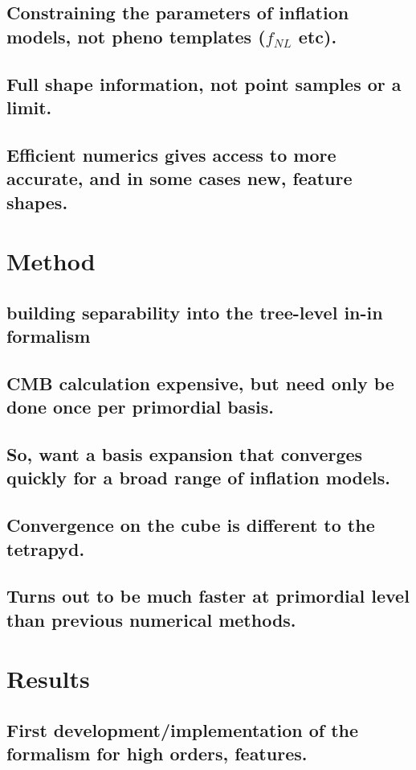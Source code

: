     \subsection{Constraining the parameters of inflation models, not pheno templates ($f_{NL}$ etc).}
    \subsection{Full shape information, not point samples or a limit.}
    \subsection{Efficient numerics gives access to more accurate, and in some cases new, feature shapes.}
\section{Method}
    \subsection{building separability into the tree-level in-in formalism}
    \subsection{CMB calculation expensive, but need only be done once per primordial basis.}
    \subsection{So, want a basis expansion that converges quickly for a broad range of inflation models.}
    \subsection{Convergence on the cube is different to the tetrapyd.}
    \subsection{Turns out to be much faster at primordial level than previous numerical methods.}
\section{Results}
    \subsection{First development/implementation of the formalism for high orders, features.}
